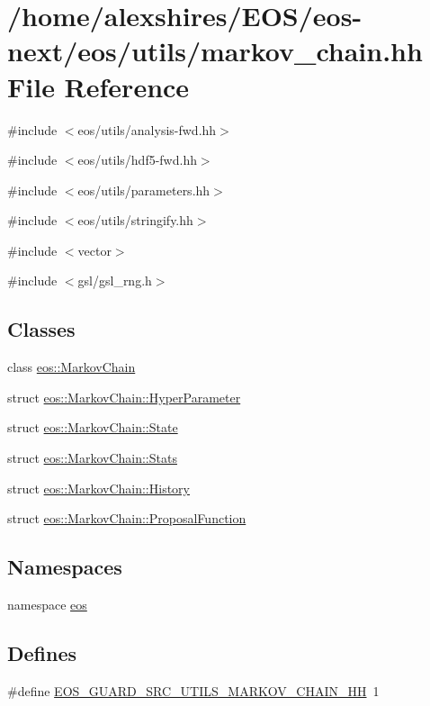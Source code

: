 \hypertarget{markov__chain_8hh}{
\section{/home/alexshires/EOS/eos-\/next/eos/utils/markov\_\-chain.hh File Reference}
\label{markov__chain_8hh}
}
{\ttfamily \#include $<$eos/utils/analysis-\/fwd.hh$>$}\par
{\ttfamily \#include $<$eos/utils/hdf5-\/fwd.hh$>$}\par
{\ttfamily \#include $<$eos/utils/parameters.hh$>$}\par
{\ttfamily \#include $<$eos/utils/stringify.hh$>$}\par
{\ttfamily \#include $<$vector$>$}\par
{\ttfamily \#include $<$gsl/gsl\_\-rng.h$>$}\par
\subsection*{Classes}
\begin{DoxyCompactItemize}
\item 
class \hyperlink{classeos_1_1MarkovChain}{eos::MarkovChain}
\item 
struct \hyperlink{structeos_1_1MarkovChain_1_1HyperParameter}{eos::MarkovChain::HyperParameter}
\item 
struct \hyperlink{structeos_1_1MarkovChain_1_1State}{eos::MarkovChain::State}
\item 
struct \hyperlink{structeos_1_1MarkovChain_1_1Stats}{eos::MarkovChain::Stats}
\item 
struct \hyperlink{structeos_1_1MarkovChain_1_1History}{eos::MarkovChain::History}
\item 
struct \hyperlink{structeos_1_1MarkovChain_1_1ProposalFunction}{eos::MarkovChain::ProposalFunction}
\end{DoxyCompactItemize}
\subsection*{Namespaces}
\begin{DoxyCompactItemize}
\item 
namespace \hyperlink{namespaceeos}{eos}
\end{DoxyCompactItemize}
\subsection*{Defines}
\begin{DoxyCompactItemize}
\item 
\#define \hyperlink{markov__chain_8hh_ae0ec1ee591df5ff97e6f782528436afc}{EOS\_\-GUARD\_\-SRC\_\-UTILS\_\-MARKOV\_\-CHAIN\_\-HH}~1
\end{DoxyCompactItemize}
